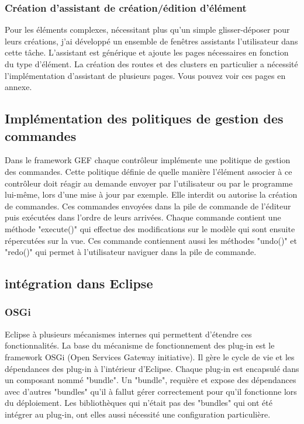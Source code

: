 \documentclass{article}
\begin{document}
        \subsubsection{Création d'assistant de création/édition d'élément}
        Pour les éléments complexes, nécessitant plus qu'un simple glisser-déposer pour leurs créations, j'ai développé un ensemble de fenêtres assistants l'utilisateur dans cette tâche. L'assistant est générique et ajoute les pages nécessaires en fonction du type d'élément. La création des routes et des clusters en particulier a nécessité l'implémentation d'assistant de plusieurs pages. Vous pouvez voir ces pages en annexe.
    \subsection{Implémentation des politiques de gestion des commandes}
    	Dans le framework GEF chaque contrôleur implémente une politique de gestion des commandes. Cette politique définie de quelle manière l'élément associer à ce contrôleur doit réagir au demande envoyer par l'utilisateur ou par le programme lui-même, lors d'une mise à jour par exemple. Elle interdit ou autorise la création de commandes. Ces commandes envoyées dans la pile de commande de l'éditeur puis exécutées dans l'ordre de leurs arrivées. Chaque commande contient une méthode "execute()" qui effectue des modifications sur le modèle qui sont ensuite répercutées sur la vue. Ces commande contiennent aussi les méthodes "undo()" et "redo()" qui permet à l'utilisateur naviguer dans la pile de commande.
    \subsection{intégration dans Eclipse}
    	\subsubsection{OSGi}
    	Eclipse à plusieurs mécanismes internes qui permettent d'étendre ces fonctionnalités. La base du mécanisme de fonctionnement des plug-in est le framework OSGi (Open Services Gateway initiative). Il gère le cycle de vie et les dépendances des plug-in à l'intérieur d'Eclipse. Chaque plug-in est encapsulé dans un composant nommé "bundle". Un "bundle", requière et expose des dépendances avec d'autres "bundles" qu'il à fallut gérer correctement pour qu'il fonctionne lors du déploiement. Les bibliothèques qui n'était pas des "bundles" qui ont été intégrer au plug-in, ont elles aussi nécessité une configuration particulière.
        
\end{document}
